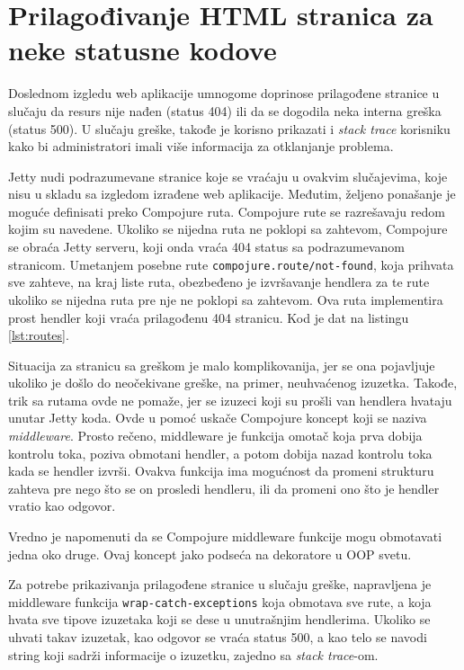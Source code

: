 {\section{Prilagođivanje HTML stranica za neke statusne kodove}
Doslednom izgledu web aplikacije umnogome doprinose prilagođene stranice u slučaju da resurs nije nađen (status 404) ili da se dogodila neka interna greška (status 500). U slučaju greške, takođe je korisno prikazati i \textit{stack trace} korisniku kako bi administratori imali više informacija za otklanjanje problema.


Jetty nudi podrazumevane stranice koje se vraćaju u ovakvim slučajevima, koje nisu u skladu sa izgledom izrađene web aplikacije. Međutim, željeno ponašanje je moguće definisati preko Compojure ruta. Compojure rute se razrešavaju redom kojim su navedene. Ukoliko se nijedna ruta ne poklopi sa zahtevom, Compojure se obraća Jetty serveru, koji onda vraća 404 status sa podrazumevanom stranicom. Umetanjem posebne rute \texttt{compojure.route/not-found}, koja prihvata sve zahteve, na kraj liste ruta, obezbeđeno je izvršavanje hendlera za te rute ukoliko se nijedna ruta pre nje ne poklopi sa zahtevom. Ova ruta implementira prost hendler koji vraća prilagođenu 404 stranicu. Kod je dat na listingu \ref{lst:routes}.


Situacija za stranicu sa greškom je malo komplikovanija, jer se ona pojavljuje ukoliko je došlo do neočekivane greške, na primer, neuhvaćenog izuzetka. Takođe, trik sa rutama ovde ne pomaže, jer se izuzeci koji su prošli van hendlera hvataju unutar Jetty koda. Ovde u pomoć uskače Compojure koncept koji se naziva \textit{middleware}. Prosto rečeno, middleware je funkcija omotač koja prva dobija kontrolu toka, poziva obmotani hendler, a potom dobija nazad kontrolu toka kada se hendler izvrši. Ovakva funkcija ima mogućnost da promeni strukturu zahteva pre nego što se on prosledi hendleru, ili da promeni ono što je hendler vratio kao odgovor.

Vredno je napomenuti da se Compojure middleware funkcije mogu obmotavati jedna oko druge. Ovaj koncept jako podseća na dekoratore u OOP svetu.

Za potrebe prikazivanja prilagođene stranice u slučaju greške, napravljena je middleware funkcija \texttt{wrap-catch-exceptions} koja obmotava sve rute, a koja hvata sve tipove izuzetaka koji se dese u unutrašnjim hendlerima. Ukoliko se uhvati takav izuzetak, kao odgovor se vraća status 500, a kao telo se navodi string koji sadrži informacije o izuzetku, zajedno sa \textit{stack trace}-om.

}
